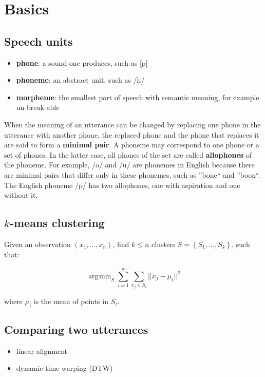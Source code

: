 \documentclass[11pt]{article}
\DeclareMathOperator*{\argmin}{\arg\!\min}
\begin{document}
\section{Basics}

\subsection{Speech units}

\begin{itemize}
    \item \textbf{phone}: a sound one produces, such as [p]
    \item \textbf{phoneme}: an abstract unit, such as /h/
    \item \textbf{morpheme}: the smallest part of speech with semantic meaning, for example un-break-able
\end{itemize}

When the meaning of an utterance can be changed by replacing one phone in the utterance with another phone, the replaced phone and the phone that replaces it are said to form a \textbf{minimal pair}.
A phoneme may correspond to one phone or a set of phones. In the latter case, all phones of the set are called \textbf{allophones} of the phoneme.
For example, /o/ and /u/ are phonemes in English because there are minimal pairs that differ only in these phonemes, such as ''bone`` and ''boon``. The English phoneme /p/ has two allophones, one with aspiration and one without it.

\subsection{$k$-means clustering}

Given an observation $(x_1, \ldots, x_n)$, find $k \leq n$ clusters $S = \left\{S_1, \ldots, S_k\right\}$, such that:

\[
    \argmin_S \sum\limits_{i = 1}^k \sum\limits_{x_j \in S_i} ||x_j - \mu_i||^2
\]

where $\mu_i$ is the mean of points in $S_i$.

\subsection{Comparing two utterances}

\begin{itemize}
    \item linear alignment
    \item dynamic time warping (DTW)
\end{itemize}
\end{document}
